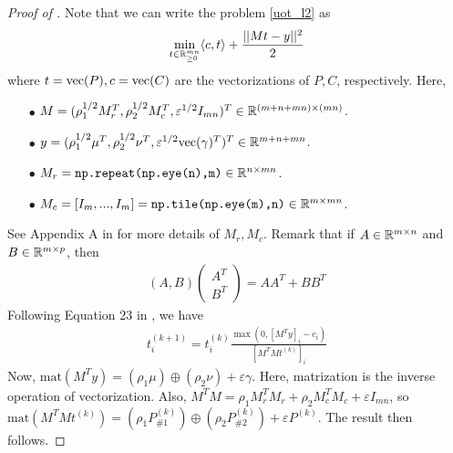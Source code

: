 \begin{proof}[Proof of ]
Note that we can write the problem \ref{uot_l2} as
\begin{align}
    \min_{t \in \mathbb R^{mn}_{\geq 0}} \langle c, t \rangle + \frac{|| Mt - y ||^2}{2}
\end{align}
where $t = \text{vec}(P), c = \text{vec}(C)$ are the vectorizations of $P, C$, respectively. Here,
\begin{itemize}
    \item[$\bullet$] $M = (\rho_1^{1/2} M_r^T, \rho_2^{1/2} M_c^T, \varepsilon^{1/2} I_{mn})^T \in \mathbb R^{(m + n + mn) \times (mn)}$.

    \item[$\bullet$] $y = (\rho_1^{1/2} \mu^T, \rho_2^{1/2} \nu^T, \varepsilon^{1/2} \text{vec}(\gamma)^T)^T \in \mathbb R^{m + n + mn}$.

    \item[$\bullet$] $M_r = \texttt{np.repeat(np.eye(n),m)} \in \mathbb R^{n \times mn}$.

    \item[$\bullet$] $M_c = [I_m, ..., I_m] = \texttt{np.tile(np.eye(m),n)} \in \mathbb R^{m \times mn}$.
\end{itemize}
See Appendix A in \citep{Chapel21} for more details of $M_r, M_c$.
Remark that if $A \in \mathbb R^{m \times n}$ and $B \in \mathbb R^{m \times p}$, then
\begin{align}
    (A, B) \begin{pmatrix}
        A^T \\
        B^T
    \end{pmatrix}
    = A A^T + B B^T
\end{align}
Following Equation 23 in \citep{Chapel21},  we have
\begin{align}
    t^{(k+1)}_i = t^{(k)}_i \frac{\max( 0, [M^T y]_i - c_i)}{[M^T M t^{(k)}]_i}
\end{align}
Now, $\text{mat}(M^T y) = (\rho_1 \mu) \oplus (\rho_2 \nu) + \varepsilon \gamma$.
Here, matrization is the inverse operation of vectorization. Also,
$M^T M = \rho_1 M_r^T M_r + \rho_2 M_c^T M_c + \varepsilon I_{mn}$, so
$\text{mat}(M^T M t^{(k)}) = (\rho_1 P_{\# 1}^{(k)}) \oplus (\rho_2 P_{\# 2}^{(k)})
+ \varepsilon P^{(k)} $. The result then follows.
\end{proof}

